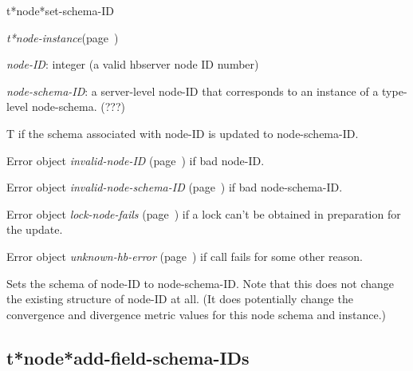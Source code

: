 \begin{description}
\item [Name:]  t*node*set-schema-ID

\item [Class:] {\sl t*node-instance}\hfill(page~\pageref{t*node-instance})

\item [Parameters:]
\item {\sl node-ID}:  
integer (a valid hbserver node ID number)

\item {\sl node-schema-ID}:  a server-level node-ID that corresponds to an 
instance of a type-level node-schema. (???)



\item [Return-value:]
T if the schema associated with node-ID is updated to 
node-schema-ID.

Error object {\sl invalid-node-ID} (page~\pageref{invalid-node-ID}) if bad node-ID.

Error object {\sl invalid-node-schema-ID} (page~\pageref{invalid-node-schema-ID}) if bad
node-schema-ID.

Error object {\sl lock-node-fails} (page~\pageref{lock-node-fails}) if a lock can't be
obtained in preparation for the update. 

Error object {\sl unknown-hb-error} (page~\pageref{unknown-hb-error}) if call fails for
some other reason.

\item [Description:]

Sets the schema of node-ID to node-schema-ID. Note
that this does not change the existing structure of
node-ID at all. (It does potentially change the
convergence and divergence metric values for this
node schema and instance.)


\item [Public:]





\end{description}
\horizontalline

\subsection{t*node*add-field-schema-IDs}
\label{t*node*add-field-schema-IDs}

